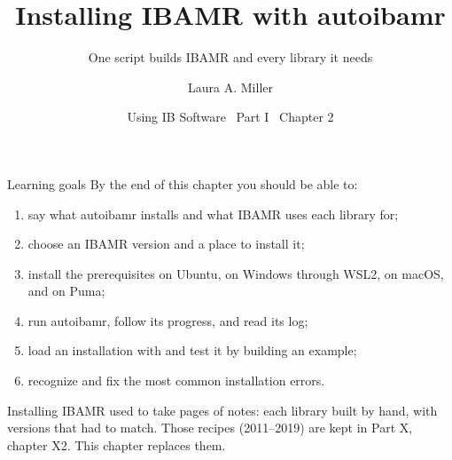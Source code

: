 \documentclass[aspectratio=169,11pt]{beamer}
\title[Installing IBAMR]{Installing IBAMR with autoibamr}
\subtitle{One script builds IBAMR and every library it needs}
\author[Miller]{Laura A. Miller}
\institute[UArizona]{Department of Mathematics, University of Arizona}
\date{Using IB Software \textbullet\ Part I \textbullet\ Chapter 2}
\begin{document}
\begin{frame}[plain]
\end{frame}

\begin{frame}{Learning goals}
By the end of this chapter you should be able to:
\begin{enumerate}
  \item say what autoibamr installs and what IBAMR uses each library for;
  \item choose an IBAMR version and a place to install it;
  \item install the prerequisites on Ubuntu, on Windows through WSL2, on macOS, and on Puma;
  \item run autoibamr, follow its progress, and read its log;
  \item load an installation with  and test it by building an example;
  \item recognize and fix the most common installation errors.
\end{enumerate}
\vspace{4mm}
\begin{punchbox}
\small Installing IBAMR used to take pages of notes: each library built by hand, with versions that had to match. Those recipes (2011--2019) are kept in Part X, chapter X2. This chapter replaces them.
\end{punchbox}
\end{frame}
\end{document}

